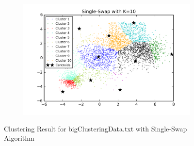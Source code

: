 \begin{figure}[htb]
\begin{subfigure}[b]{0.475\textwidth}
            \includegraphics[width=\textwidth]{./figures/bigClustering_singleSwap_10.png}
        \end{subfigure}
        
        \caption{Clustering Result for bigClusteringData.txt with Single-Swap Algorithm}
        \label{fig:kmean_clustering}
\end{figure}

